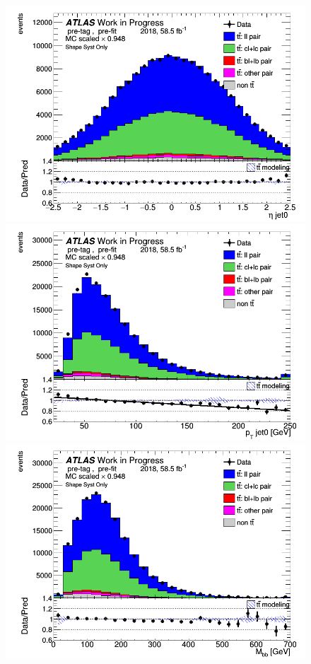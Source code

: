 \documentclass[letterpaper,12pt]{article}
\begin{document}
\begin{figure}[H]
\begin{minipage}[b]{.45\textwidth}
	\centering
	\includegraphics[width=1\textwidth]{Distribution_March_highpT/DataMC_J0_eta.png}
	\end{minipage}\hfill
	\begin{minipage}[b]{.45\textwidth}
	\centering
	\includegraphics[width=1\textwidth]{Distribution_March_highpT/DataMC_J0_pt.png}
	\end{minipage}\hfill
	\begin{minipage}[b]{.45\textwidth}
	\centering
	\includegraphics[width=1\textwidth]{Distribution_March_highpT/DataMC_Mbb.png}

\end{minipage}
\end{figure}
\end{document}
